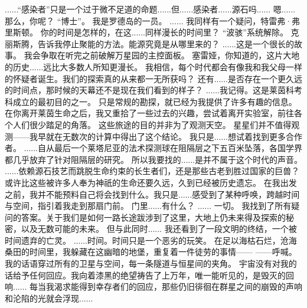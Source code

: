 \documentclass[openany]{book}
\begin{document}
\begin{dialogue}
     ......“感染者”只是一个过于微不足道的命题......但......感染者......源石吗......
     嗯......
     那么，你呢？
     “博士”。
     我是罗德岛的一员。
     ......
     我同样有一个疑问，特雷弗·弗里斯顿。
     你的时间是怎样的，在这......同样漫长的时间里？
     “波骇”系统解除。
     克丽斯腾，告诉我停止聚能的方法。能源究竟是从哪里来的？
     ......这是一个很长的故事。
     我会争取在听完之前破解万星园的主控面板。
     塞雷娅，你知道的，这片大地的历史......远比大多数人所知更漫长。
     我相信，每个时代都会有像我和我父母一样的怀疑者诞生。我们的探索真的从来都一无所获吗？
     还有......是否存在一个更久远的时间点，那时候的天幕还不是现在我们看到的样子？
     ......我记得。这是莱茵科考科成立的最初目的之一。
     只是常规的勘探，就已经为我提供了许多有趣的信息。
     在你离开莱茵生命之后，我又重拾了一些过去的兴趣，尝试着离开实验室，前往各个人们很少踏足的角落。
     这些旅途的目的并非为了观测天空。
     星星们并不值得观测——我早就在无数次的计算中得出了这个结论。
     我只是......想试着找到更多合作者。
     ......自从最后一个莱塔尼亚的法术探测球在阻隔层之下五百米坠落，各国学界都几乎放弃了针对阻隔层的研究。
     所以我要找的......是并不属于这个时代的声音。
     ......依赖源石技艺而跳脱生命约束的长生者们，还是那些古老到胜过国家的巨兽？
     或许比这些被许多人奉为神祇的生命还要久远，久到已经被历史遗忘。
     在我出发之前，我并不能预料自己将会找到什么。我只是......感受到了某种呼唤，跨越时间与空间，指引着我走到那扇门前。
     门里......有什么？
     ......
     一切。
     我找到了所有疑问的答案。关于我们是如何一路长途跋涉到了这里，大地上仍未来得及探索的秘密，以及无数可能的未来。
     但与此同时......
     我还看到了一段文明的终结，一个被时间遗弃的亡灵。
     ......时间。时间只是一个恶劣的玩笑。
     在足以海枯石烂，沧海桑田的时间里，我躲藏在这幽暗的地堡，重复着一件徒劳的事情——
     ——呼喊。
     我的话语穿过所有的卫星与空间，每一条隧道与恒星间的夹角。
     宇宙没有对我的话给予任何回应。我向着漆黑的绝望祷告了上万年，唯一能听见的，是毁灭的回响......
     每当我渴求能得到幸存者们的回应，那些仍旧徘徊在群星之间的崩毁的声响和沦陷的光就会浮现......

\end{dialogue}
\end{document}
